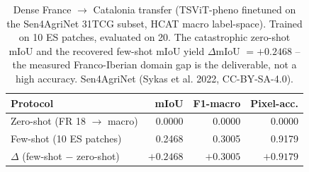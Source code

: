 \begin{table}[t]
\centering
\caption{Dense France $\rightarrow$ Catalonia transfer (TSViT-pheno finetuned on the Sen4AgriNet 31TCG subset, HCAT macro label-space). Trained on 10 ES patches, evaluated on 20. The catastrophic zero-shot mIoU and the recovered few-shot mIoU yield $\Delta$mIoU $= +0.2468$ -- the measured Franco-Iberian domain gap is the deliverable, not a high accuracy. Sen4AgriNet (Sykas et al. 2022, CC-BY-SA-4.0).}
\label{tab:sen4agrinet_domain_gap}
\begin{tabular}{lrrr}
\toprule
Protocol & mIoU & F1-macro & Pixel-acc. \\
\midrule
Zero-shot (FR 18 $\rightarrow$ macro) & 0.0000 & 0.0000 & 0.0000 \\
Few-shot (10 ES patches) & 0.2468 & 0.3005 & 0.9179 \\
\midrule
$\Delta$ (few-shot $-$ zero-shot) & $+0.2468$ & $+0.3005$ & $+0.9179$ \\
\bottomrule
\end{tabular}
\end{table}
